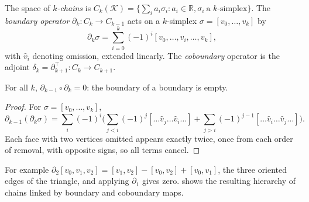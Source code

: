 \begin{definition}
\label{def:gauge:chains}
The space of \emph{$k$-chains} is $C_k(\mathcal{K}) = \{\sum_i a_i\sigma_i : a_i
\in \mathbb{R}, \sigma_i\ \text{a } k\text{-simplex}\}$. The \emph{boundary
operator} $\partial_k\colon C_k \to C_{k-1}$ acts on a $k$-simplex $\sigma =
[v_0, \ldots, v_k]$ by
\[
  \partial_k \sigma = \sum_{i=0}^k (-1)^i [v_0, \ldots, \hat v_i, \ldots, v_k],
\]
with $\hat v_i$ denoting omission, extended linearly. The \emph{coboundary}
operator is the adjoint $\delta_k = \partial_{k+1}^{\!\top}\colon C_k \to
C_{k+1}$.
\end{definition}

\begin{theorem}[$\partial^2 = 0$]
\label{thm:gauge:partial-squared}
For all $k$, $\partial_{k-1}\circ\partial_k = 0$: the boundary of a boundary is
empty.
\end{theorem}

\begin{proof}
For $\sigma = [v_0, \ldots, v_k]$,
\[
  \partial_{k-1}(\partial_k\sigma) = \sum_{i} (-1)^i \Big(\sum_{j<i}(-1)^j
  [\ldots \hat v_j \ldots \hat v_i \ldots] + \sum_{j>i}(-1)^{j-1}
  [\ldots \hat v_i \ldots \hat v_j \ldots]\Big).
\]
Each face with two vertices omitted appears exactly twice, once from each order
of removal, with opposite signs, so all terms cancel.
\end{proof}

For example $\partial_2[v_0, v_1, v_2] = [v_1, v_2] - [v_0, v_2] + [v_0, v_1]$,
the three oriented edges of the triangle, and applying $\partial_1$ gives zero.
 shows the resulting hierarchy of chains
linked by boundary and coboundary maps.

